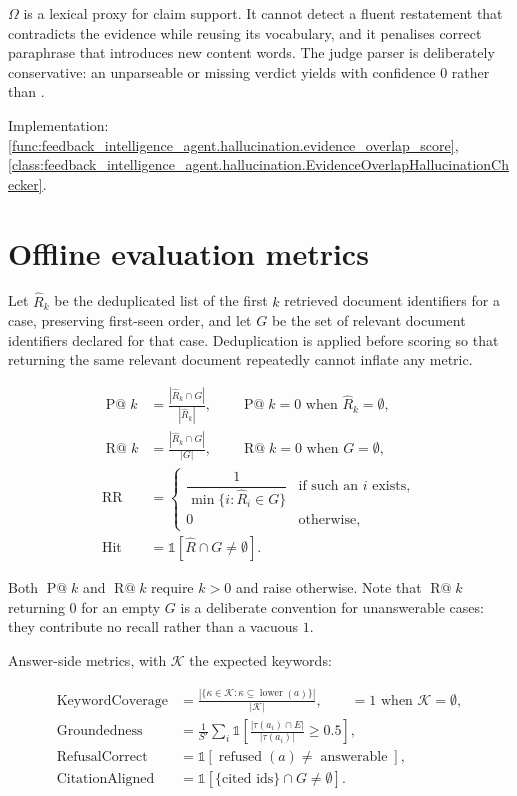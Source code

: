 $\Omega$ is a lexical proxy for claim support. It cannot detect a fluent
restatement that contradicts the evidence while reusing its vocabulary, and it
penalises correct paraphrase that introduces new content words. The judge
parser is deliberately conservative: an unparseable or missing verdict yields
 with confidence $0$ rather than .

\medskip\noindent
Implementation: \cref{func:feedback_intelligence_agent.hallucination.evidence_overlap_score},
\cref{class:feedback_intelligence_agent.hallucination.EvidenceOverlapHallucinationChecker}.

\section{Offline evaluation metrics}
\label{sec:math-evaluation}

Let $\hat{R}_k$ be the deduplicated list of the first $k$ retrieved document
identifiers for a case, preserving first-seen order, and let $G$ be the set of
relevant document identifiers declared for that case. Deduplication is applied
before scoring so that returning the same relevant document repeatedly cannot
inflate any metric.

\begin{align}
\operatorname{P@}k &= \frac{|\hat{R}_k \cap G|}{|\hat{R}_k|},
  \qquad \operatorname{P@}k = 0 \text{ when } \hat{R}_k = \emptyset, \\
\operatorname{R@}k &= \frac{|\hat{R}_k \cap G|}{|G|},
  \qquad \operatorname{R@}k = 0 \text{ when } G = \emptyset, \\
\operatorname{RR} &= \begin{cases}
  \dfrac{1}{\min\{i : \hat{R}_i \in G\}} & \text{if such an } i \text{ exists},\\
  0 & \text{otherwise,}
\end{cases} \\
\operatorname{Hit} &= \mathbb{1}\!\left[\hat{R} \cap G \neq \emptyset\right].
\end{align}

Both $\operatorname{P@}k$ and $\operatorname{R@}k$ require $k > 0$ and raise
otherwise. Note that $\operatorname{R@}k$ returning $0$ for an empty $G$ is a
deliberate convention for unanswerable cases: they contribute no recall rather
than a vacuous $1$.

Answer-side metrics, with $\mathcal{K}$ the expected keywords:

\begin{align}
\operatorname{KeywordCoverage}
  &= \frac{|\{\kappa \in \mathcal{K} : \kappa \subseteq \operatorname{lower}(a)\}|}
          {|\mathcal{K}|},
  \qquad = 1 \text{ when } \mathcal{K} = \emptyset, \\
\operatorname{Groundedness}
  &= \frac{1}{S'}\sum_{i} \mathbb{1}\!\left[
      \frac{|\tau(a_i) \cap E|}{|\tau(a_i)|} \geq 0.5\right], \\
\operatorname{RefusalCorrect}
  &= \mathbb{1}\!\left[\operatorname{refused}(a) \neq \operatorname{answerable}\right], \\
\operatorname{CitationAligned}
  &= \mathbb{1}\!\left[\{\text{cited ids}\} \cap G \neq \emptyset\right].
\end{align}

